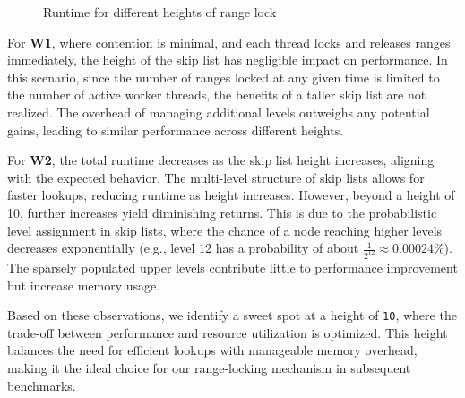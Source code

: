 \begin{figure}[h]
    \centering
    \caption{Runtime for different heights of range lock}
\end{figure}

For \textbf{W1}, where contention is minimal, and each thread locks and releases ranges immediately, the height of the skip list has negligible impact on performance. In this scenario, since the number of ranges locked at any given time is limited to the number of active worker threads, the benefits of a taller skip list are not realized. The overhead of managing additional levels outweighs any potential gains, leading to similar performance across different heights.

For \textbf{W2}, the total runtime decreases as the skip list height increases, aligning with the expected behavior. The multi-level structure of skip lists allows for faster lookups, reducing runtime as height increases. However, beyond a height of 10, further increases yield diminishing returns. This is due to the probabilistic level assignment in skip lists, where the chance of a node reaching higher levels decreases exponentially (e.g., level 12 has a probability of about \(\frac{1}{2^{12}} \approx 0.00024\%\)). The sparsely populated upper levels contribute little to performance improvement but increase memory usage.

Based on these observations, we identify a sweet spot at a height of \texttt{10}, where the trade-off between performance and resource utilization is optimized. This height balances the need for efficient lookups with manageable memory overhead, making it the ideal choice for our range-locking mechanism in subsequent benchmarks.

